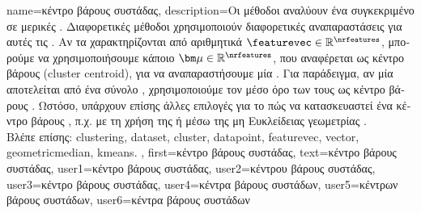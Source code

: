 {name={\foreignlanguage{greek}{κέντρο βάρους συστάδας}}, 
	description={\foreignlanguage{greek}{Οι μέθοδοι}  
		\foreignlanguage{greek}{αναλύουν ένα συγκεκριμένο}  \foreignlanguage{greek}{σε μερικές} . 
		\foreignlanguage{greek}{Διαφορετικές μέθοδοι}  \foreignlanguage{greek}{χρησιμοποιούν διαφορετικές αναπαραστάσεις
		για αυτές τις} . \foreignlanguage{greek}{Αν τα}  \foreignlanguage{greek}{χαρακτηρίζονται από
		αριθμητικά}  $\featurevec \in \mathbb{R}^{\nrfeatures}$, \foreignlanguage{greek}{μπορούμε να χρησιμοποιήσουμε κάποιο}
		 ${\bm \mu} \in \mathbb{R}^{\nrfeatures}$, \foreignlanguage{greek}{που αναφέρεται ως κέντρο βάρους}   
		(cluster centroid), \foreignlanguage{greek}{για να αναπαραστήσουμε μία} . \foreignlanguage{greek}{Για παράδειγμα, αν μία} 
		 \foreignlanguage{greek}{αποτελείται από ένα σύνολο} , \foreignlanguage{greek}{χρησιμοποιούμε τον 
		μέσο όρο των}  \foreignlanguage{greek}{τους ως κέντρο βάρους} . \foreignlanguage{greek}{Ωστόσο, 
		υπάρχουν επίσης άλλες επιλογές για το πώς να κατασκευαστεί ένα κέντρο βάρους} , \foreignlanguage{greek}{π.χ. 
		με τη χρήση της}  \cite{PARK20093336} \foreignlanguage{greek}{ή μέσω της μη Ευκλείδειας γεωμετρίας}
		\cite{JMLR:v6:banerjee05b}.
		\\
		\foreignlanguage{greek}{Βλέπε επίσης:} \gls{clustering}, \gls{dataset}, \gls{cluster}, \gls{datapoint}, \gls{featurevec}, \gls{vector}, 
		\gls{geometricmedian}, \gls{kmeans}. },
	first={\foreignlanguage{greek}{κέντρο βάρους συστάδας}},
	text={\foreignlanguage{greek}{κέντρο βάρους συστάδας}},
	user1={\foreignlanguage{greek}{κέντρο βάρους συστάδας}}, %
	user2={\foreignlanguage{greek}{κέντρου βάρους συστάδας}}, %
	user3={\foreignlanguage{greek}{κέντρο βάρους συστάδας}}, %
	user4={\foreignlanguage{greek}{κέντρα βάρους συστάδων}}, %
	user5={\foreignlanguage{greek}{κέντρων βάρους συστάδων}}, %
	user6={\foreignlanguage{greek}{κέντρα βάρους συστάδων}} %
}

